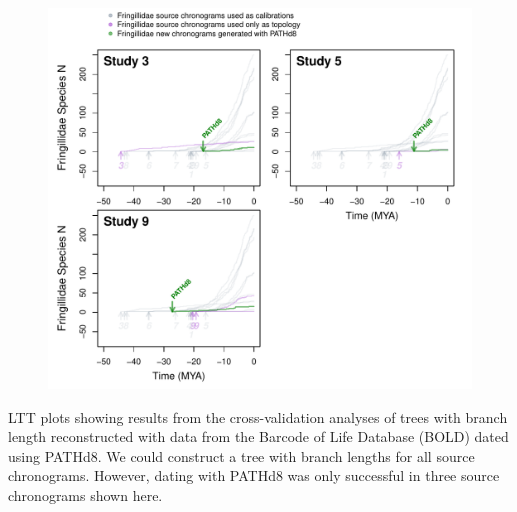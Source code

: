 \documentclass[]{article}
\begin{document}
\begin{figure}[!h]
\includegraphics{./figures/fig_crossval_boldsumm.pdf}
\caption{}
\label{fig:cvbold}
\end{figure}
LTT plots showing results from the cross-validation analyses of trees with branch length reconstructed with data from the Barcode of Life Database (BOLD) dated using PATHd8. We could construct a tree with branch lengths for all source chronograms. However, dating with PATHd8 was only successful in three source chronograms shown here.

\end{document}

